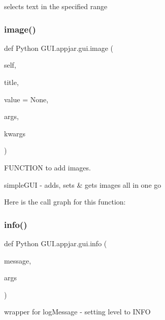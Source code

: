 \begin{DoxyVerb}selects text in the specified range \end{DoxyVerb}
 \mbox{\label{class_python_01_g_u_i_1_1appjar_1_1gui_a17243935a5285eba9b2b6b0eb3e9d86a}} 
\subsubsection{\texorpdfstring{image()}{image()}}
{\footnotesize\ttfamily def Python G\+U\+I.\+appjar.\+gui.\+image (\begin{DoxyParamCaption}\item[{}]{self,  }\item[{}]{title,  }\item[{}]{value = {\ttfamily None},  }\item[{}]{args,  }\item[{}]{kwargs }\end{DoxyParamCaption})}



F\+U\+N\+C\+T\+I\+ON to add images. 

\begin{DoxyVerb}simpleGUI - adds, sets & gets images all in one go \end{DoxyVerb}
 Here is the call graph for this function\+:
\mbox{\label{class_python_01_g_u_i_1_1appjar_1_1gui_a71dda91e53aec8d7b4ffe6d37f0dc129}} 
\subsubsection{\texorpdfstring{info()}{info()}}
{\footnotesize\ttfamily def Python G\+U\+I.\+appjar.\+gui.\+info (\begin{DoxyParamCaption}\item[{}]{message,  }\item[{}]{args }\end{DoxyParamCaption})\hspace{0.3cm}{\ttfamily [static]}}

\begin{DoxyVerb}wrapper for logMessage - setting level to INFO \end{DoxyVerb}
 \mbox{\label{class_python_01_g_u_i_1_1appjar_1_1gui_a899e593dca96dd2a31035558b685e3bd}} 
